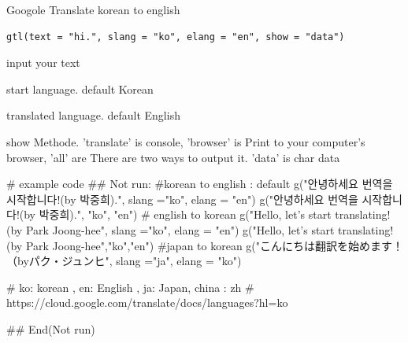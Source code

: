 \documentclass[a4paper]{book}
\begin{document}
%
\begin{Description}
Googole Translate korean to english
\end{Description}
%
\begin{Usage}
\begin{verbatim}
gtl(text = "hi.", slang = "ko", elang = "en", show = "data")
\end{verbatim}
\end{Usage}
%
\begin{Arguments}
\begin{ldescription}
\item[\code{text}] input your text

\item[\code{slang}] start language. default Korean

\item[\code{elang}] translated language. default English

\item[\code{show}] show Methode. 'translate' is console, 'browser'  is Print to your computer's browser, 'all' are There are two ways to output it. 'data' is char data
\end{ldescription}
\end{Arguments}
%
\begin{Examples}
\begin{ExampleCode}
# example code
\#\# Not run: 
#korean to english : default
g("안녕하세요 번역을 시작합니다!(by 박중희).", slang ="ko", elang = "en")
g("안녕하세요 번역을 시작합니다!(by 박중희).", "ko", "en")
# english to korean
g("Hello, let’s start translating! (by Park Joong-hee", slang ="ko", elang = "en")
g("Hello, let’s start translating! (by Park Joong-hee","ko","en")
#japan to korean
g("こんにちは翻訳を始めます！（byパク・ジュンヒ", slang ="ja", elang = "ko")

# ko: korean , en: English , ja: Japan, china : zh
# https://cloud.google.com/translate/docs/languages?hl=ko

## End(Not run)
\end{ExampleCode}
\end{Examples}
\end{document}
